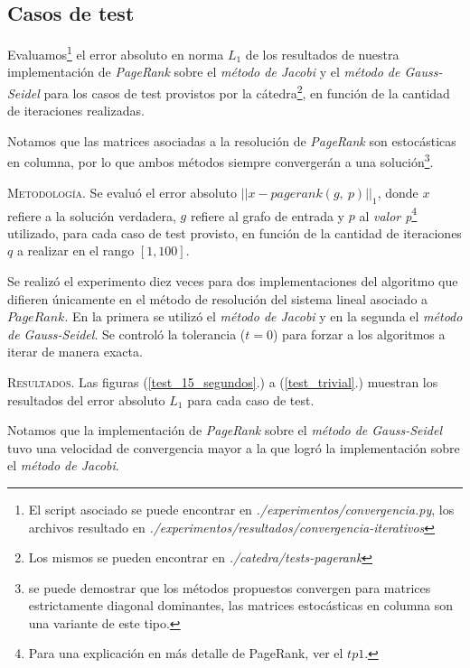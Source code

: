 \vspace{2em}
\subsection{Casos de test}

Evaluamos\footnote{El script asociado se puede encontrar en \textit{./experimentos/convergencia.py}, los archivos resultado en \textit{./experimentos/resultados/convergencia-iterativos}} el error absoluto en norma $L_1$ de los resultados de nuestra implementación de \textit{PageRank} sobre el \textit{método de Jacobi} y el \textit{método de Gauss-Seidel} para los casos de test provistos por la cátedra\footnote{Los mismos se pueden encontrar en \textit{./catedra/tests-pagerank}}, en función de la cantidad de iteraciones realizadas.

Notamos que las matrices asociadas a la resolución de \textit{PageRank} son estocásticas en columna, por lo que ambos métodos siempre convergerán a una solución\footnote{se puede demostrar que los métodos propuestos convergen para matrices estrictamente diagonal dominantes, las matrices estocásticas en columna son una variante de este tipo.}. 

\vspace{2em}
\noindent\textsc{Metodología}. Se evaluó el error absoluto $||x - pagerank(g,\ p)||_1$, donde $x$ refiere a la solución verdadera, $g$ refiere al grafo de entrada y $p$ al \textit{valor p}\footnote{Para una explicación en más detalle de PageRank, ver el $tp1$.} utilizado, para cada caso de test provisto, en función de la cantidad de iteraciones $q$ a realizar en el rango $[1, 100]$.

Se realizó el experimento diez veces para dos implementaciones del algoritmo que difieren únicamente en el método de resolución del sistema lineal asociado a $PageRank$. En la primera se utilizó el \textit{método de Jacobi} y en la segunda el \textit{método de Gauss-Seidel}. Se controló la tolerancia ($t = 0$) para forzar a los algoritmos a iterar de manera exacta. 

\vspace{2em}
\noindent\textsc{Resultados}. Las figuras (\ref{test_15_segundos}.) a (\ref{test_trivial}.) muestran los resultados del error absoluto $L_1$ para cada caso de test. 

\vspace{1em}
Notamos que la implementación de \textit{PageRank} sobre el \textit{método de Gauss-Seidel} tuvo una velocidad de convergencia mayor a la que logró la implementación sobre el \textit{método de Jacobi}.

